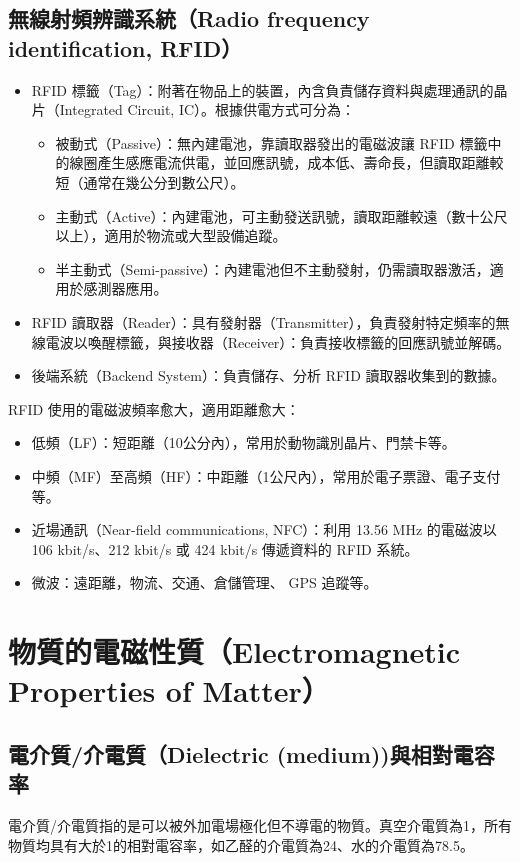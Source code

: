 \documentclass[a4paper,12pt]{report}
\begin{document}
\begin{itemize}
\subsection{無線射頻辨識系統（Radio frequency identification, RFID）}
\begin{itemize}
\item RFID 標籤（Tag）：附著在物品上的裝置，內含負責儲存資料與處理通訊的晶片（Integrated Circuit, IC）。根據供電方式可分為：
\begin{itemize}
\item 被動式（Passive）：無內建電池，靠讀取器發出的電磁波讓 RFID 標籤中的線圈產生感應電流供電，並回應訊號，成本低、壽命長，但讀取距離較短（通常在幾公分到數公尺）。
\item 主動式（Active）：內建電池，可主動發送訊號，讀取距離較遠（數十公尺以上），適用於物流或大型設備追蹤。
\item 半主動式（Semi-passive）：內建電池但不主動發射，仍需讀取器激活，適用於感測器應用。
\end{itemize}
\item RFID 讀取器（Reader）：具有發射器（Transmitter），負責發射特定頻率的無線電波以喚醒標籤，與接收器（Receiver）：負責接收標籤的回應訊號並解碼。
\item 後端系統（Backend System）：負責儲存、分析 RFID 讀取器收集到的數據。
\end{itemize}
RFID 使用的電磁波頻率愈大，適用距離愈大：
\begin{itemize}
\item 低頻（LF）：短距離（10公分內），常用於動物識別晶片、門禁卡等。
\item 中頻（MF）至高頻（HF）：中距離（1公尺內），常用於電子票證、電子支付等。
\item 近場通訊（Near-field communications, NFC）：利用 13.56 MHz 的電磁波以 106 kbit/s、212 kbit/s 或 424 kbit/s 傳遞資料的 RFID 系統。
\item 微波：遠距離，物流、交通、倉儲管理、 GPS 追蹤等。
\end{itemize}


\section{物質的電磁性質（Electromagnetic Properties of Matter）}
\subsection{電介質/介電質（Dielectric (medium))與相對電容率}
電介質/介電質指的是可以被外加電場極化但不導電的物質。真空介電質為1，所有物質均具有大於1的相對電容率，如乙醛的介電質為24、水的介電質為78.5。

\end{itemize}
\end{document}
